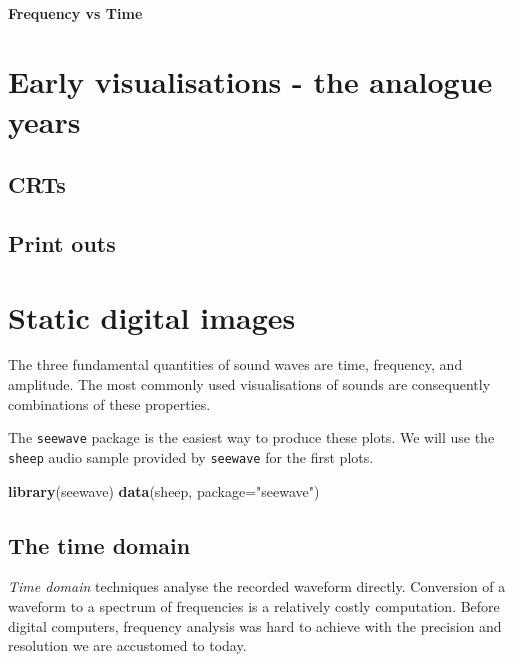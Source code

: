 \documentclass[
]{book}
\newenvironment{Shaded}{\begin{snugshade}}{\end{snugshade}}
\newcommand{\AttributeTok}[1]{\textcolor[rgb]{0.13,0.29,0.53}{#1}}
\newcommand{\FunctionTok}[1]{\textcolor[rgb]{0.13,0.29,0.53}{\textbf{#1}}}
\newcommand{\NormalTok}[1]{#1}
\newcommand{\StringTok}[1]{\textcolor[rgb]{0.31,0.60,0.02}{#1}}
\begin{document}
\hypertarget{frequency-vs-time}{%
\subsubsection{Frequency vs Time}\label{frequency-vs-time}}

\hypertarget{early-viz}{%
\chapter{Early visualisations - the analogue years}\label{early-viz}}

\hypertarget{crts}{%
\section{CRTs}\label{crts}}

\hypertarget{print-outs}{%
\section{Print outs}\label{print-outs}}

\hypertarget{static-digital-images}{%
\chapter{Static digital images}\label{static-digital-images}}

The three fundamental quantities of sound waves are time, frequency, and amplitude. The most commonly used visualisations of sounds are consequently combinations of these properties.

The \texttt{seewave} package \citep{seewave} is the easiest way to produce these plots. We will use the \texttt{sheep} audio sample provided by \texttt{seewave} for the first plots.

\begin{Shaded}
\begin{Highlighting}[]
\FunctionTok{library}\NormalTok{(seewave)}
\FunctionTok{data}\NormalTok{(sheep, }\AttributeTok{package=}\StringTok{"seewave"}\NormalTok{)}
\end{Highlighting}
\end{Shaded}

\hypertarget{the-time-domain}{%
\section{The time domain}\label{the-time-domain}}

\emph{Time domain} techniques analyse the recorded waveform directly. Conversion of a waveform to a spectrum of frequencies is a relatively costly computation. Before digital computers, frequency analysis was hard to achieve with the precision and resolution we are accustomed to today.
\end{document}
